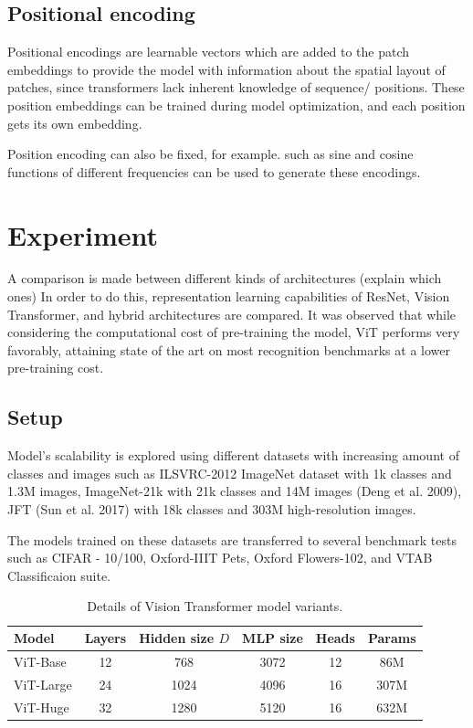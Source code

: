 \documentclass[conference]{IEEEtran}
\begin{document}
\subsection{Positional encoding}
Positional encodings are learnable vectors which are added to the patch embeddings to provide the model with information about the spatial layout of patches, since transformers lack inherent knowledge of sequence/ positions.
These position embeddings can be trained during model optimization, and each position gets its own embedding.

Position encoding can also be fixed, for example. such as sine and cosine functions of different frequencies can be used to generate these encodings.


\section{Experiment}

A comparison is made between different kinds of architectures (explain which ones)
In order to do this, representation learning capabilities of ResNet, Vision Transformer, and hybrid architectures are compared. It was observed that while considering the computational cost of pre-training the model, ViT performs very favorably, attaining state of the art on most recognition benchmarks at a lower pre-training cost.

\subsection{Setup}


Model's scalability is explored using different datasets with increasing amount of classes and images such as ILSVRC-2012 ImageNet dataset with 1k classes and 1.3M images, ImageNet-21k with 21k classes and 14M images (Deng et al. 2009), JFT (Sun et al. 2017) with 18k classes and 303M high-resolution images.

The models trained on these datasets are transferred to several benchmark tests such as CIFAR - 10/100, Oxford-IIIT Pets, Oxford Flowers-102, and VTAB Classificaion suite.


\begin{table}[htbp]
\centering
\caption{Details of Vision Transformer model variants.}
\label{tab:vit_model_variants}
\begin{tabular}{lccccc}
\toprule
\textbf{Model}     & \textbf{Layers} & \textbf{Hidden size $D$} & \textbf{MLP size} & \textbf{Heads} & \textbf{Params} \\ 
\midrule
ViT-Base           & 12              & 768                      & 3072              & 12             & 86M             \\ 
ViT-Large          & 24              & 1024                     & 4096              & 16             & 307M            \\ 
ViT-Huge           & 32              & 1280                     & 5120              & 16             & 632M            \\ 
\bottomrule
\end{tabular}
\end{table}
\end{document}
